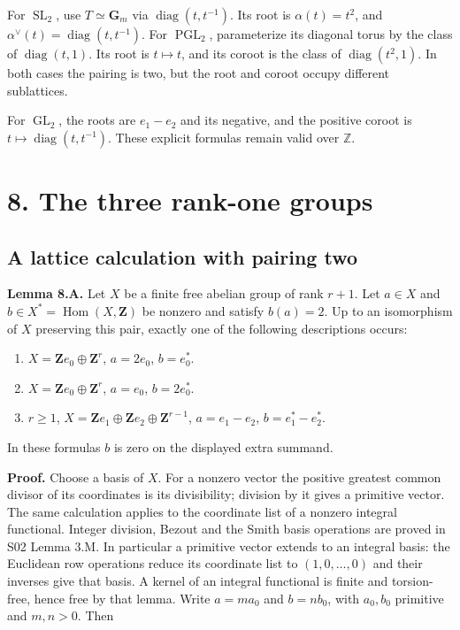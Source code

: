 \documentclass[11pt,a4paper,openany]{report}
\providecommand{\tightlist}{\setlength{\itemsep}{0pt}\setlength{\parskip}{0pt}}
\begin{document}
For \(\operatorname{SL}_2\), use \(T\simeq\mathbf G_m\) via \(\operatorname{diag}(t,t^{-1})\). Its root is \(\alpha(t)=t^2\), and \(\alpha^\vee(t)=\operatorname{diag}(t,t^{-1})\). For \(\operatorname{PGL}_2\), parameterize its diagonal torus by the class of \(\operatorname{diag}(t,1)\). Its root is \(t\mapsto t\), and its coroot is the class of \(\operatorname{diag}(t^2,1)\). In both cases the pairing is two, but the root and coroot occupy different sublattices.

For \(\operatorname{GL}_2\), the roots are \(e_1-e_2\) and its negative, and the positive coroot is \(t\mapsto\operatorname{diag}(t,t^{-1})\). These explicit formulas remain valid over \(\mathbb Z\).

\section{8. The three rank-one groups}\label{AG-RG-03-the-three-rank-one-groups}

\subsection{A lattice calculation with pairing two}\label{AG-RG-03-a-lattice-calculation-with-pairing-two}

\textbf{Lemma 8.A.} Let \(X\) be a finite free abelian group of rank \(r+1\). Let \(a\in X\) and \(b\in X^*=\operatorname{Hom}(X,\mathbf Z)\) be nonzero and satisfy \(b(a)=2\). Up to an isomorphism of \(X\) preserving this pair, exactly one of the following descriptions occurs:

\begin{enumerate}
\def\labelenumi{\arabic{enumi}.}
\tightlist
\item
  \(X=\mathbf Z e_0\oplus\mathbf Z^r\), \(a=2e_0\), \(b=e_0^*\).
\item
  \(X=\mathbf Z e_0\oplus\mathbf Z^r\), \(a=e_0\), \(b=2e_0^*\).
\item
  \(r\geq1\), \(X=\mathbf Z e_1\oplus\mathbf Z e_2\oplus\mathbf Z^{r-1}\), \(a=e_1-e_2\), \(b=e_1^*-e_2^*\).
\end{enumerate}

In these formulas \(b\) is zero on the displayed extra summand.

\textbf{Proof.} Choose a basis of \(X\). For a nonzero vector the positive greatest common divisor of its coordinates is its divisibility; division by it gives a primitive vector. The same calculation applies to the coordinate list of a nonzero integral functional. Integer division, Bezout and the Smith basis operations are proved in S02 Lemma 3.M. In particular a primitive vector extends to an integral basis: the Euclidean row operations reduce its coordinate list to \((1,0,\ldots,0)\) and their inverses give that basis. A kernel of an integral functional is finite and torsion-free, hence free by that lemma. Write \(a=m a_0\) and \(b=n b_0\), with \(a_0,b_0\) primitive and \(m,n>0\). Then
\end{document}
